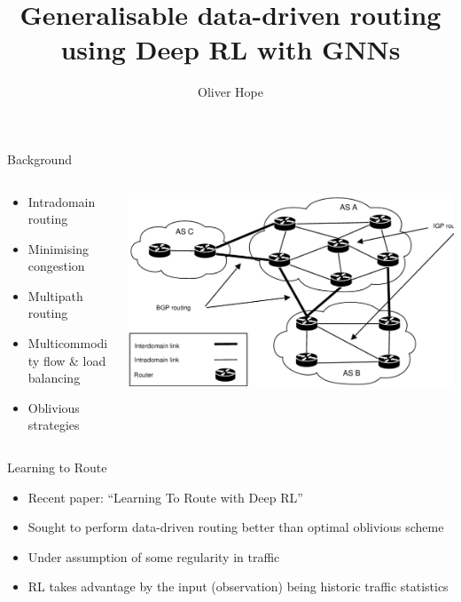 \documentclass{beamer}
\title{Generalisable data-driven routing using Deep RL with GNNs}
\author{Oliver Hope}
\institute{Jesus College}\date{}
\begin{document}
\maketitle

\begin{frame}{Background}
\begin{columns}
  \begin{column}{0.5\textwidth}
    \begin{itemize}
      \item Intradomain routing
      \item Minimising congestion
      \item Multipath routing
      \item Multicommodity flow \& load balancing
      \item Oblivious strategies\cite{racke2002minimizing}
    \end{itemize}
  \end{column}
  \begin{column}{0.5\textwidth}
    \includegraphics[width=\textwidth]{figures/intradomain.png}
  \end{column}
\end{columns}
\end{frame}

\begin{frame}{Learning to Route}
  \begin{itemize}
    \item Recent paper: ``Learning To Route with Deep RL''\cite{valadarsky2017learning}
    \item Sought to perform data-driven routing better than optimal oblivious scheme
    \item Under assumption of some regularity in traffic
    \item RL takes advantage by the input (observation) being historic traffic statistics
  \end{itemize}
\end{frame}
\end{document}
